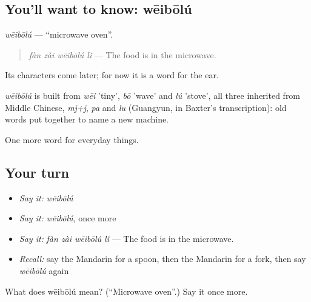\subsection*{You'll want to know: wēibōlú}
\emph{wēibōlú} — \textquotedblleft{}microwave oven\textquotedblright{}.

\begin{quote}
\emph{fàn zài wēibōlú lǐ} — The food is in the microwave.
\end{quote}

Its characters come later; for now it is a word for the ear.

\begin{cousinweb}
\emph{wēibōlú} is built from \emph{wēi} 'tiny', \emph{bō} 'wave' and \emph{lú} 'stove', all three inherited from Middle Chinese, \emph{mj+j}, \emph{pa} and \emph{lu} (Guangyun, in Baxter's transcription): old words put together to name a new machine.
\end{cousinweb}

\begin{grammarlens}[title={What you've built}]
One more word for everyday things.
\end{grammarlens}

\subsection*{Your turn}
\begin{itemize}
\raggedright
  \item \emph{Say it:} \emph{wēibōlú}
  \item \emph{Say it:} \emph{wēibōlú}, once more
  \item \emph{Say it:} \emph{fàn zài wēibōlú lǐ} — The food is in the microwave.
  \item \emph{Recall:} say the Mandarin for a spoon, then the Mandarin for a fork, then say \emph{wēibōlú} again
\end{itemize}

\begin{tcolorbox}[breakable,colback=teal!4,colframe=teal!35!black,title={Before you move on}]
What does wēibōlú mean? (\textquotedblleft{}Microwave oven\textquotedblright{}.) Say it once more.
\end{tcolorbox}
